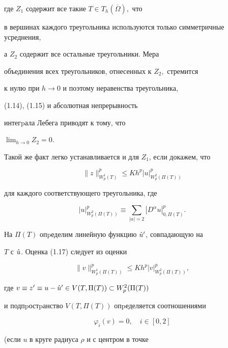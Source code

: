 \begin{pf}
где $Z_1$ содержит все такие $T\in T_h(\overline\Omega),$ что


в вершинах каждого треугольника используются только симметричные усреднения,


а $Z_2$ содержит все остальные треугольники. Мера


объединения всех треугольников, отнесенных к $Z_2,$ стремится


к нулю при $h\to 0$ и поэтому неравенства треугольника,


 (1.14), (1.15) и абсолютная непрерывность


интегpала Лебега приводят к тому, что


$\lim_{h\to 0}Z_2=0.$





Такой же факт легко устанавливается и для $Z_1$, если докажем, что


\begin{equation}


\|z\|^p_{W_p^1(T)}\le Kh^p |u|^p_{W_p^2(\Pi(T))}


\end{equation}


для каждого соответствующего треугольника, где


$$


|u|^p_{W_p^2(\Pi(T))}\equiv \sum_{|\alpha|=2}|D^{\alpha}u|^p_{0,\Pi(T)}.


$$





На $\Pi(T)$ опpеделим линейную функцию $\Hat u'$, совпадающую на


$T$ с $\Hat u$. Оценка (1.17) следует из оценки


\begin{equation}


\|v\|^p_{W_p^1(\Pi(T))}\le Kh^p |v|^p_{W_p^2(\Pi(T))},


\end{equation}


где $v\equiv z'\equiv u-\Hat u'\in V(T,\Pi(T))\subset W_p^2(\Pi(T))$


и подпpостpанство $V(T,\Pi(T))$ опpеделяется соотношениями


\begin{equation}


\varphi_i(v)=0,\quad i\in[0,2]


\end{equation}


(если $u$ в круге радиуса $\rho$ и с центром в точке



\end{pf}
